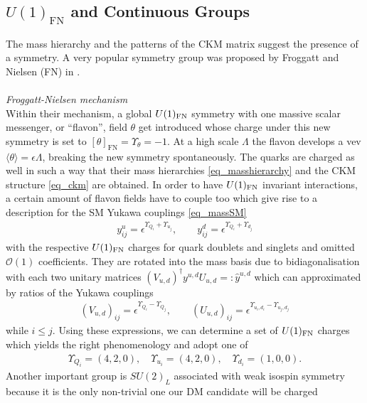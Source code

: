 \subsection{$U(1)_\text{FN}$ and Continuous Groups}
\label{sec_FNGT}
The mass hierarchy and the patterns of the CKM matrix suggest the presence of a symmetry. A very popular symmetry group was proposed
by Froggatt and Nielsen (FN) in \cite{FN}. 
\\ \\ \textit{Froggatt-Nielsen mechanism}\\
\noindent Within their mechanism, a global $U(1)_\text{FN}$ symmetry with one massive scalar messenger, 
or ``flavon'', field $\theta$ get introduced whose charge under this new symmetry is set to $[\theta]_\text{FN} = \Upsilon_\theta=-1$. At a high scale $\Lambda$ the
flavon develops a vev $\langle \theta \rangle = \epsilon\Lambda$, breaking the new symmetry spontaneously. The quarks are charged as well in such 
a way that their mass hierarchies \eqref{eq_masshierarchy} and the CKM structure \eqref{eq_ckm} are obtained. In order to have $U(1)_\text{FN}$ invariant
interactions, a certain amount of flavon fields have to couple too which give rise to a description for the SM Yukawa couplings \eqref{eq_massSM}
\begin{align}
 y^u_{ij} = \epsilon^{\Upsilon_{Q_i} + \Upsilon_{u_j}},\qquad y^d_{ij} = \epsilon^{\Upsilon_{Q_i} + \Upsilon_{d_j}}
 \label{eq_quarkyukawa}
\end{align}
with the respective $U(1)_\text{FN}$ charges for quark doublets and singlets and omitted $\mathcal{O}(1)$ coefficients. They are rotated into the mass basis 
due to bidiagonalisation with each two unitary
matrices ${\left(V_{u,d}\right)^\dagger y^{u,d}U_{u,d}=:\hat{y}^{u,d}}$ which can approximated by ratios of the Yukawa couplings \cite{1501.07268}
\begin{align}
 \left(V_{u,d}\right)_{ij} = \epsilon^{\Upsilon_{Q_i} - \Upsilon_{Q_j}},\qquad\left(U_{u,d}\right)_{ij} = \epsilon^{\Upsilon_{u_i,d_i} - \Upsilon_{u_j,d_j}}
\end{align}
while $i\leq j$. Using these expressions, we can determine a set of $U(1)_\text{FN}$ charges which yields the right phenomenology and adopt one of \cite{0501071}
\begin{align}
 \Upsilon_{Q_i}=(4,2,0),\quad \Upsilon_{u_i}=(4,2,0),\quad \Upsilon_{d_i}=(1,0,0).
 \label{eq_fnchargesQ}
\end{align}
Another important group is $SU(2)_L$ associated with weak isospin symmetry because it is the only non-trivial one our DM candidate will be charged 
